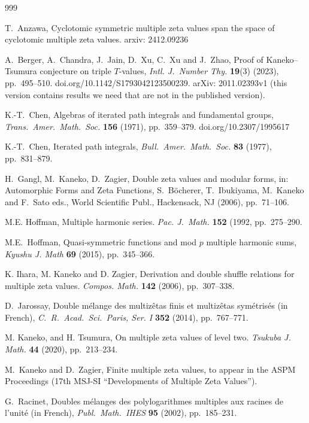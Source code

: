 \documentclass{article}
\theoremstyle{plain}
\theoremstyle{definition}
\begin{document}
\begin{thebibliography}{999}

T.\ Anzawa, Cyclotomic symmetric multiple zeta values span the space of cyclotomic multiple zeta values. arxiv: 2412.09236

A.\ Berger, A.\ Chandra, J.\ Jain, D.\ Xu, C.\ Xu and J.\ Zhao,
Proof of Kaneko--Tsumura conjecture on triple $T$-values, \emph{Intl. J.\ Number Thy.} \textbf{19}(3) (2023), pp.\ 495--510.
doi.org/10.1142/S1793042123500239.  arXiv: 2011.02393v1 (this version contains results we need that are not in the published version).

K.-T.\ Chen, Algebras of iterated path integrals and fundamental groups,
\emph{Trans.\ Amer.\ Math.\ Soc.} \textbf{156} (1971), pp.\ 359--379. doi.org/10.2307/1995617

K.-T.\ Chen, Iterated path integrals,
\emph{Bull.\ Amer.\ Math.\ Soc.} \textbf{83} (1977), pp.\ 831--879.

H.\ Gangl, M.\ Kaneko, D.\ Zagier, Double zeta values and modular forms,
in: Automorphic Forms and Zeta Functions, S.\ B\"ocherer, T.\ Ibukiyama, M.\ Kaneko and F.\ Sato eds.,
World Scientific Publ., Hackensack, NJ (2006), pp.\ 71--106.

M.E. Hoffman, Multiple harmonic series.
\emph{Pac. J.\ Math.} \textbf{152} (1992, pp.\ 275--290.

M.E.\ Hoffman, Quasi-symmetric functions and mod $p$ multiple harmonic sums,
\emph{Kyushu J. Math} \textbf{69} (2015), pp.\ 345--366.

K. Ihara, M. Kaneko and D. Zagier, Derivation and double shuffle relations for multiple zeta values.
\emph{Compos. Math.} \textbf{142} (2006), pp.\ 307--338.

D.\ Jarossay, Double m\'elange des multiz\^etas finis et multiz\^etas sym\'etris\'es (in French),
\emph{C.\ R.\ Acad.\ Sci.\ Paris, Ser. I} \textbf{352} (2014), pp.\ 767--771.

M. Kaneko, and H. Tsumura, On multiple zeta values of level two. \emph{Tsukuba J. Math.}
\textbf{44} (2020), pp.\ 213--234.

M.\ Kaneko and D.\ Zagier, Finite multiple zeta values, to appear in the ASPM Proceedings (17th MSJ-SI ``Developments of Multiple Zeta Values'').

G.\ Racinet, Doubles m\'elanges des polylogarithmes multiples aux
racines de l'unit\'e (in French),
\emph{Publ.\ Math.\ IHES} \textbf{95} (2002), pp.\ 185--231.


\end{thebibliography}
\end{document}
